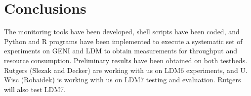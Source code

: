 \section{Conclusions}
The monitoring tools have been developed, shell scripts have been coded, and Python and R programs have been implemented to execute a systematic set of experiments on GENI and LDM to obtain measurements for throughput and resource
consumption. Preliminary results have been obtained on both testbeds. Rutgers (Slezak and Decker)
are working with us on LDM6 experiments, and U. Wisc (Robaidek) is working with us on LDM7 testing and evaluation. Rutgers will also test LDM7.